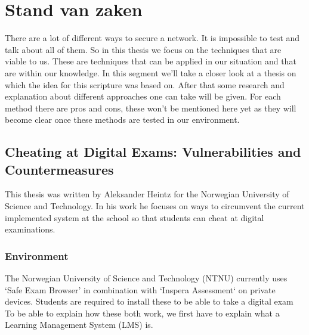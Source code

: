 \chapter{Stand van zaken}
\label{ch:stand-van-zaken}



There are a lot of different ways to secure a network. It is impossible to test and talk about all of them. So in this thesis we focus on the techniques that are viable to us. These are techniques that can be applied in our situation and that are within our knowledge. In this segment we'll take a closer look at a thesis on which the idea for this scripture was based on. After that some research and explanation about different approaches one can take will be given. For each method there are pros and cons, these won't be mentioned here yet as they will become clear once these methods are tested in our environment.
\section{Cheating at Digital Exams: Vulnerabilities and Countermeasures}
This thesis was written by Aleksander Heintz for the Norwegian University of Science and Technology. In his work he focuses on ways to circumvent the current implemented system at the school so that students can cheat at digital examinations.
\subsection{Environment}
The Norwegian University of Science and Technology (NTNU) currently uses `Safe Exam Browser' in combination with `Inspera Assessment` on private devices. Students are required to install these to be able to take a digital exam
To be able to explain how these both work, we first have to explain what a Learning Management System (LMS) is.

